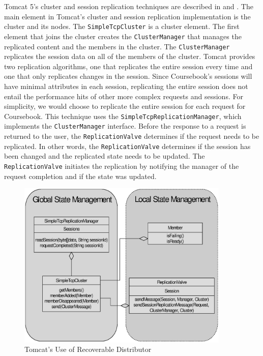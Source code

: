 Tomcat 5's cluster and session replication techniques are described in
\cite{Tomcat} and \cite{Tomcat2}. The main element in Tomcat's cluster and
session replication implementation is the cluster and its nodes. The
\texttt{SimpleTcpCluster} is a cluster element. The first element that joins the
cluster creates the \texttt{ClusterManager} that manages the replicated content
and the members in the cluster. The \texttt{ClusterManager} replicates the
session data on all of the members of the cluster. Tomcat provides two
replication algorithms, one that replicates the entire session every time and
one that only replicates changes in the session. Since Coursebook's sessions
will have minimal attributes in each session, replicating the entire session
does not entail the performance hits of other more complex requests and
sessions. For simplicity, we would choose to replicate the entire session for
each request for Coursebook. This technique uses the
\texttt{SimpleTcpReplicationManager}, which implements the
\texttt{ClusterManager} interface. Before the response to a request is returned
to the user, the \texttt{ReplicationValve} determines if the request needs to be
replicated. In other words, the \texttt{ReplicationValve} determines if the
session has been changed and the replicated state needs to be updated. The
\texttt{ReplicationValve} initiates the replication by notifying the manager of
the request completion and if the state was updated.

\begin{figure}
\begin{center}
  \centering
  \includegraphics[width=0.9\textwidth]{./images/tomcatRecoverableDistributor}
  \caption{Tomcat's Use of Recoverable Distributor}
  \label{fig:tomcat}
\end{center}
\end{figure}

